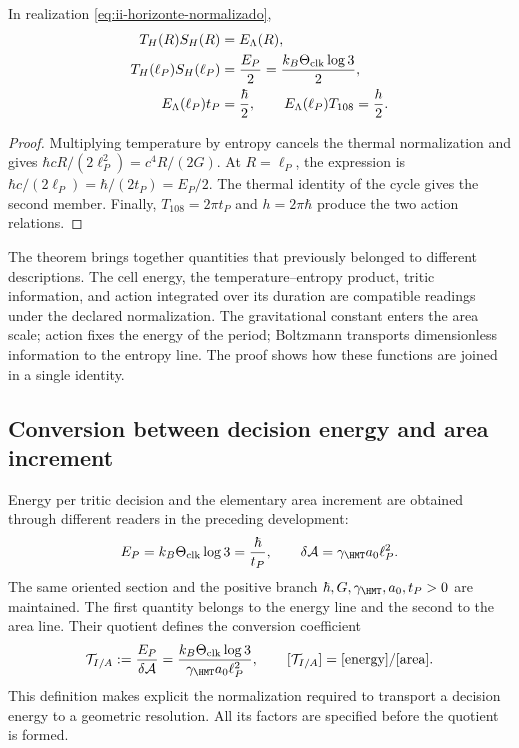 \begin{theorem}
In realization \eqref{eq:ii-horizonte-normalizado},
\begin{align}
 T_H(R)S_H(R)&=E_\Lambda(R),\\
 T_H(\ell_P)S_H(\ell_P)&=\frac{E_P}{2}
 =\frac{k_B\Theta_{\rm clk}\log3}{2},\\
 E_\Lambda(\ell_P)t_P&=\frac{\hbar}{2},\qquad
 E_\Lambda(\ell_P)T_{108}=\frac h2.
\end{align}
\end{theorem}
\begin{proof}
Multiplying temperature by entropy cancels the thermal
normalization and gives \(\hbar cR/(2\ell_P^2)=c^4R/(2G)\).
At \(R=\ell_P\), the expression is \(\hbar c/(2\ell_P)
=\hbar/(2t_P)=E_P/2\). The thermal identity of the cycle gives
the second member. Finally, \(T_{108}=2\pi t_P\) and
\(h=2\pi\hbar\) produce the two action relations.
\end{proof}

The theorem brings together quantities that previously belonged to different
descriptions. The cell energy, the temperature--entropy product,
tritic information, and action integrated over its duration are
compatible readings under the declared normalization. The gravitational
constant enters the area scale; action fixes the energy
of the period; Boltzmann transports dimensionless information to the
entropy line. The proof shows how these functions are
joined in a single identity.

\subsection{Conversion between decision energy and area increment}
\label{sec:ii-conversion-informacion-area}

Energy per tritic decision and the elementary area increment are
obtained through different readers in the preceding development:
\begin{equation}
 E_P=k_B\Theta_{\rm clk}\log3=\frac{\hbar}{t_P},
 \qquad
 \delta\mathcal A=\gamma_{\HMT}a_0\ell_P^2.
 \label{eq:ii-confluencia-cuanto-energia-area}
\end{equation}
The same oriented section and the positive branch
\(\hbar,G,\gamma_{\HMT},a_0,t_P>0\) are maintained. The first quantity
belongs to the energy line and the second to the area line.
Their quotient defines the conversion coefficient
\begin{equation}
 \mathcal T_{I/A}
 :=\frac{E_P}{\delta\mathcal A}
 =\frac{k_B\Theta_{\rm clk}\log3}
        {\gamma_{\HMT}a_0\ell_P^2},
 \qquad [\mathcal T_{I/A}]=[\text{energy}]/[\text{area}].
 \label{eq:ii-confluencia-tension}
\end{equation}
This definition makes explicit the normalization required to transport
a decision energy to a geometric resolution. All its factors
are specified before the quotient is formed.

